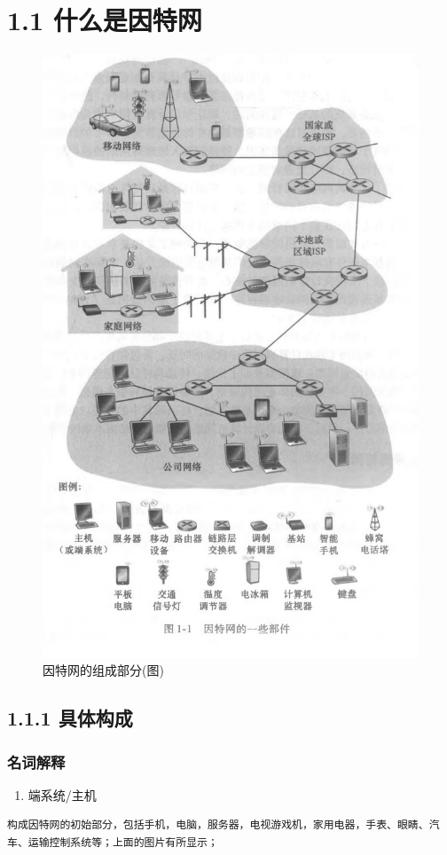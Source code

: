 \documentclass[11pt]{article}
\author{谢树强}
\date{\today}
\title{}
\begin{document}
\tableofcontents

\section{1.1 什么是因特网}
\label{sec:orgba7f4c7}

\begin{figure}[htbp]
\centering
\includegraphics[width=.9\linewidth]{imag/Snipaste_2023-11-19_12-29-46.png}
\caption{因特网的组成部分(图)}
\end{figure}

\subsection{1.1.1 具体构成}
\label{sec:org998b900}

\subsubsection{名词解释}
\label{sec:org49979cb}
\begin{enumerate}
\item 端系统/主机
\end{enumerate}
\begin{verbatim}
构成因特网的初始部分，包括手机，电脑，服务器，电视游戏机，家用电器，手表、眼睛、汽车、运输控制系统等；上面的图片有所显示；
\end{verbatim}
\end{document}
